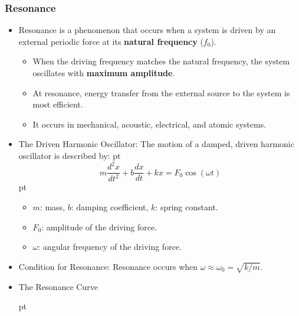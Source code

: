 \documentclass[t,aspectratio=169]{beamer}
\begin{document}
\begin{frame}
  \frametitle{Resonance}
\begin{itemize}
\item Resonance is a phenomenon that occurs when a system is driven by an external periodic force at its \textbf{natural frequency} ($f_0$).
\begin{itemize}
\item When the driving frequency matches the natural frequency, the system oscillates with \textbf{maximum amplitude}.
\item At resonance, energy transfer from the external source to the system is most efficient.
\item It occurs in mechanical, acoustic, electrical, and atomic systems.
\end{itemize}

\item The Driven Harmonic Oscillator: The motion of a damped, driven harmonic oscillator is described by:
 pt
\begin{equation*}
m\frac{d^2x}{dt^2} + b\frac{dx}{dt} + kx = F_0 \cos(\omega t)
\end{equation*}
 pt
\begin{itemize}
\item $m$: mass, $b$: damping coefficient, $k$: spring constant.
\item $F_0$: amplitude of the driving force.
\item $\omega$: angular frequency of the driving force.
\end{itemize}
\item Condition for Resonance: Resonance occurs when $\omega \approx \omega_0 = \sqrt{k/m}$.

\pagebreak  
\item The Resonance Curve
  \begin{center}
     pt
\end{center}
\end{itemize}
\end{frame}
\end{document}
